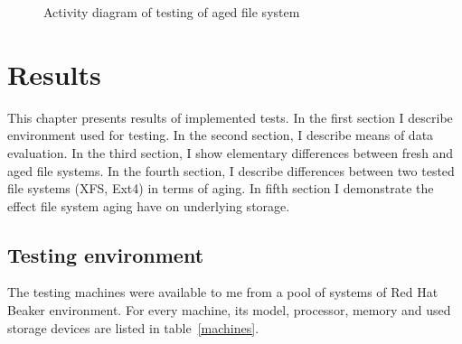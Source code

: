 \documentclass[
  color, %
  table, %
  lof,   %
  lot,   %
]{fithesis3}
\begin{document}
\begin{figure}[ht]
    \centering
    \caption{Activity diagram of testing of aged file system}
    \label{fig:rec_activity}
\end{figure}







\chapter{Results}
\label{results}
This chapter presents results of implemented tests. In the first section I describe environment used for testing. In the second section, I describe means of data evaluation. In the third section, I show elementary differences between fresh and aged file systems. In the fourth section, I describe differences between two tested file systems (XFS, Ext4) in terms of aging. In fifth section I demonstrate the effect file system aging have on underlying storage.

\section{Testing environment}
\label{env}
The testing machines were available to me from a pool of systems of Red Hat Beaker environment. For every machine, its model, processor, memory and used storage devices are listed in table~\ref{machines}.
\end{document}
